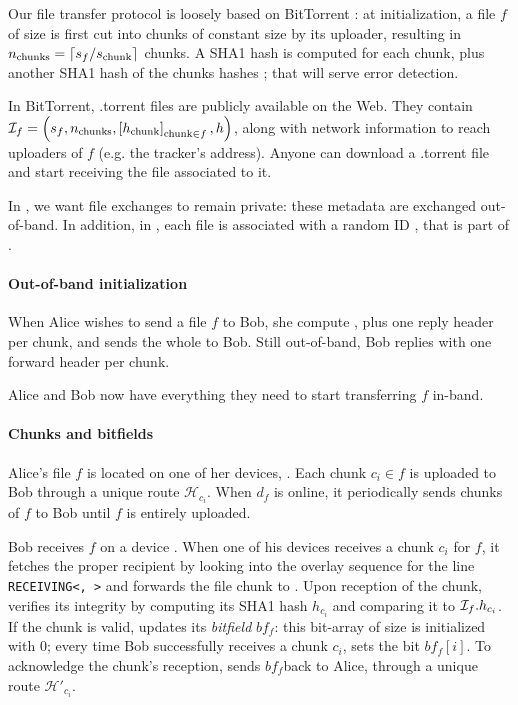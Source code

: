 Our file transfer protocol is loosely based on BitTorrent \cite{bt_bep3}: 
at initialization, a file $f$ of size \filesize is first cut into chunks of constant size \chunksize by its uploader,
resulting in $n_{\text{chunks}} = \lceil s_f / s_{\text{chunk}} \rceil$ chunks.
A SHA1 hash \hashchunk is computed for each chunk, plus another SHA1 hash \hashfile of the chunks hashes ; that will serve error detection. 


In BitTorrent, .torrent files are publicly available on the Web.
They contain $\mathcal{I}_f = \left(s_f, n_{\text{chunks}}, \left[h_{\text{chunk}}\right]_{\text{chunk} \in f}, h\right)$, 
along with network information to reach uploaders of $f$ (e.g. the tracker's address).
Anyone can download a .torrent file and start receiving the file associated to it.

In \name, we want file exchanges to remain private: these metadata are exchanged out-of-band.
In addition, in \name, each file is associated with a random ID \fileid, that is part of \finfo.

\paragraph*{Out-of-band initialization} 
When Alice wishes to send a file $f$ to Bob, she compute \finfo, 
plus one reply header per chunk, and sends the whole to Bob.
Still out-of-band, Bob replies with one forward header per chunk.

Alice and Bob now have everything they need to start transferring $f$ in-band.

\newcommand\bitfield{\ensuremath{bf_f}}
\paragraph*{Chunks and bitfields}
Alice's file $f$ is located on one of her devices, \sendingdevice. 
Each chunk $c_i \in f$ is uploaded to Bob through a unique route $\mathcal{H}_{c_i}$.
When $d_f$ is online, it periodically sends chunks of $f$ to Bob until $f$ is entirely uploaded.

Bob receives $f$ on a device \recdevice. 
When one of his devices receives a chunk $c_i$ for $f$, it fetches the proper recipient \recdevice by looking into the \squad overlay sequence
for the line \texttt{RECEIVING<\sendingdevice, \fileid>} and forwards the file chunk to \recdevice.
Upon reception of the chunk, \recdevice verifies its integrity by computing its SHA1 hash $h_{c_i}$ and comparing it to $\mathcal{I}_f.h_{c_i}$.
If the chunk is valid, \recdevice updates its \emph{bitfield} \bitfield: this bit-array of size \nchunks is initialized with 0;
every time Bob successfully receives a chunk $c_i$, \recdevice sets the bit $\bitfield[i]$.
To acknowledge the chunk's reception, \recdevice sends \bitfield back to Alice, through a unique route $\mathcal{H}'_{c_i}$.


